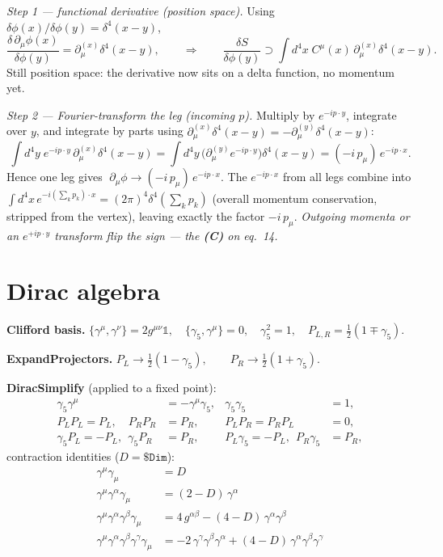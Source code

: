 \documentclass[11pt]{article}
\newcommand{\g}{g}
\newcommand{\gm}[1]{\gamma^{#1}}
\newcommand{\gfive}{\gamma_5}
\newcommand{\code}[1]{\texttt{#1}}
\begin{document}
\emph{Step 1 --- functional derivative (position space).}\quad
Using $\delta\phi(x)/\delta\phi(y)=\delta^4(x-y)$,
\begin{equation}
\frac{\delta\,\partial_\mu\phi(x)}{\delta\phi(y)}=\partial_\mu^{(x)}\delta^4(x-y),
\qquad\Rightarrow\qquad
\frac{\delta S}{\delta\phi(y)}\supset\int d^4x\;C^\mu(x)\,\partial_\mu^{(x)}\delta^4(x-y).
\end{equation}
Still position space: the derivative now sits on a delta function, no momentum yet.

\emph{Step 2 --- Fourier-transform the leg (incoming $p$).}\quad
Multiply by $e^{-ip\cdot y}$, integrate over $y$, and integrate by parts using
$\partial_\mu^{(x)}\delta^4(x-y)=-\partial_\mu^{(y)}\delta^4(x-y)$:
\begin{equation}
\int d^4y\;e^{-ip\cdot y}\,\partial_\mu^{(x)}\delta^4(x-y)
=\int d^4y\,\big(\partial_\mu^{(y)}e^{-ip\cdot y}\big)\delta^4(x-y)
=(-i\,p_\mu)\,e^{-ip\cdot x}.
\end{equation}
Hence one leg gives $\;\partial_\mu\phi\to(-i\,p_\mu)\,e^{-ip\cdot x}$. The
$e^{-ip\cdot x}$ from all legs combine into
$\int d^4x\,e^{-i(\sum_k p_k)\cdot x}=(2\pi)^4\delta^4(\sum_k p_k)$ (overall
momentum conservation, stripped from the vertex), leaving exactly the factor
$-i\,p_\mu$. \emph{Outgoing momenta or an $e^{+ip\cdot y}$ transform flip the
sign --- the \textbf{(C)} on eq.~14.}

\section{Dirac algebra}
\textbf{Clifford basis.}\quad
$\{\gm{\mu},\gm{\nu}\}=2\g^{\mu\nu}\mathbb{1},\quad \{\gfive,\gm{\mu}\}=0,\quad \gfive^2=1,\quad P_{L,R}=\tfrac12(1\mp\gfive).$

\textbf{ExpandProjectors.}\quad
$P_L\to\tfrac12(1-\gfive),\qquad P_R\to\tfrac12(1+\gfive).$

\textbf{DiracSimplify} (applied to a fixed point):
\begin{align}
\gfive\gm{\mu} &= -\gm{\mu}\gfive, & \gfive\gfive &= 1,\\
P_LP_L=P_L,\quad P_RP_R&=P_R, & P_LP_R=P_RP_L&=0,\\
\gfive P_L=-P_L,\ \ \gfive P_R&=P_R, & P_L\gfive=-P_L,\ \ P_R\gfive&=P_R,
\end{align}
contraction identities ($D=\code{\$Dim}$):
\begin{align}
\gm{\mu}\gamma_\mu &= D\\
\gm{\mu}\gm{\alpha}\gamma_\mu &= (2-D)\,\gm{\alpha}\\
\gm{\mu}\gm{\alpha}\gm{\beta}\gamma_\mu &= 4\,\g^{\alpha\beta} - (4-D)\,\gm{\alpha}\gm{\beta}\\
\gm{\mu}\gm{\alpha}\gm{\beta}\gm{\gamma}\gamma_\mu &= -2\,\gm{\gamma}\gm{\beta}\gm{\alpha} + (4-D)\,\gm{\alpha}\gm{\beta}\gm{\gamma}
\end{align}
\end{document}
